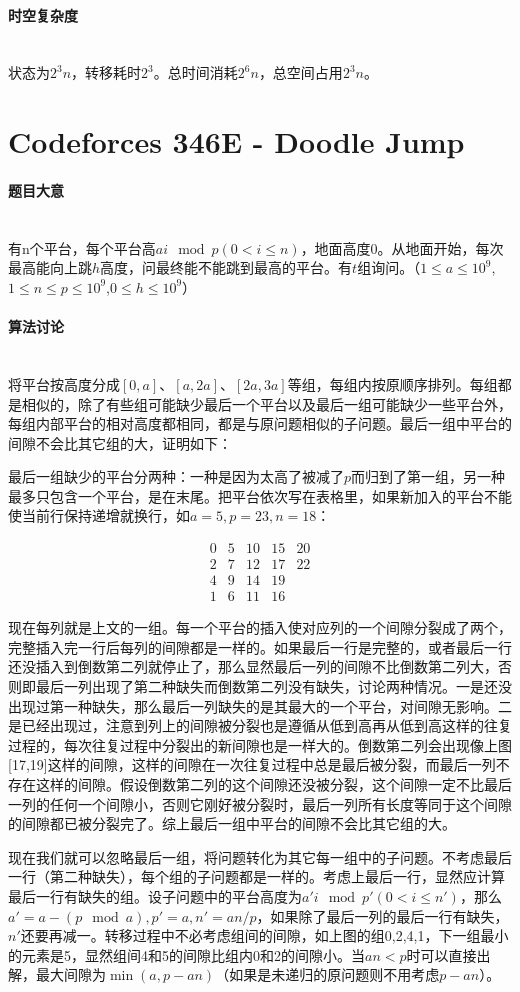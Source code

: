 \documentclass[UTF8]{ctexart}
\newcommand{\myparagraph}[1]{\paragraph{#1}\mbox{}\\}
\theoremstyle{nonumberplain}
\begin{document}
		
		\myparagraph{时空复杂度}
		
			状态为$2^3n$，转移耗时$2^3$。总时间消耗$2^6n$，总空间占用$2^3n$。
	
	\section{Codeforces 346E - Doodle Jump}
		
		\myparagraph{题目大意}
		
			有n个平台，每个平台高$ai \mod p (0<i \leq n)$，地面高度0。从地面开始，每次最高能向上跳$h$高度，问最终能不能跳到最高的平台。有$t$组询问。（$1 \leq a \leq 10^9$,$1 \leq n \leq p \leq 10^9$,$0 \leq h \leq 10^9$）
		
		\myparagraph{算法讨论}
		
			将平台按高度分成$[0,a]$、$[a,2a]$、$[2a,3a]$等组，每组内按原顺序排列。每组都是相似的，除了有些组可能缺少最后一个平台以及最后一组可能缺少一些平台外，每组内部平台的相对高度都相同，都是与原问题相似的子问题。最后一组中平台的间隙不会比其它组的大，证明如下：
			
			最后一组缺少的平台分两种：一种是因为太高了被减了$p$而归到了第一组，另一种最多只包含一个平台，是在末尾。把平台依次写在表格里，如果新加入的平台不能使当前行保持递增就换行，如$a=5,p=23,n=18$：
			
			$$\begin{array}{ccccc}
				0 & 5 & 10 & 15 & 20 \\
				2 & 7 & 12 & 17 & 22 \\
				4 & 9 & 14 & 19 & \\
				1 & 6 & 11 & 16 &
			\end{array}$$
			
			现在每列就是上文的一组。每一个平台的插入使对应列的一个间隙分裂成了两个，完整插入完一行后每列的间隙都是一样的。如果最后一行是完整的，或者最后一行还没插入到倒数第二列就停止了，那么显然最后一列的间隙不比倒数第二列大，否则即最后一列出现了第二种缺失而倒数第二列没有缺失，讨论两种情况。一是还没出现过第一种缺失，那么最后一列缺失的是其最大的一个平台，对间隙无影响。二是已经出现过，注意到列上的间隙被分裂也是遵循从低到高再从低到高这样的往复过程的，每次往复过程中分裂出的新间隙也是一样大的。倒数第二列会出现像上图[17,19]这样的间隙，这样的间隙在一次往复过程中总是最后被分裂，而最后一列不存在这样的间隙。假设倒数第二列的这个间隙还没被分裂，这个间隙一定不比最后一列的任何一个间隙小，否则它刚好被分裂时，最后一列所有长度等同于这个间隙的间隙都已被分裂完了。综上最后一组中平台的间隙不会比其它组的大。
			
			现在我们就可以忽略最后一组，将问题转化为其它每一组中的子问题。不考虑最后一行（第二种缺失），每个组的子问题都是一样的。考虑上最后一行，显然应计算最后一行有缺失的组。设子问题中的平台高度为$a'i \mod p' (0<i \leq n')$，那么$a'=a-(p \mod a), p'=a, n'=an/p$，如果除了最后一列的最后一行有缺失，$n'$还要再减一。转移过程中不必考虑组间的间隙，如上图的组0,2,4,1，下一组最小的元素是5，显然组间4和5的间隙比组内0和2的间隙小。当$an<p$时可以直接出解，最大间隙为$\min(a,p-an)$（如果是未递归的原问题则不用考虑$p-an$）。
		
\end{document}
